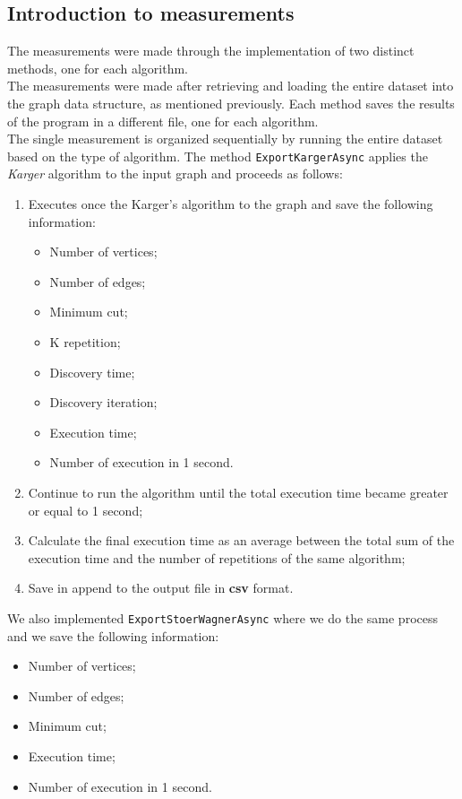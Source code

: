 \subsection{Introduction to measurements}
The measurements were made through the implementation of two distinct methods, one for each algorithm. \\ \noindent
The measurements were made after retrieving and loading the entire dataset into the graph data structure, as mentioned 
previously. Each method saves the results of the program in a different file, one for each algorithm.\\
\noindent
The single measurement is organized sequentially by running the entire dataset based on the type of algorithm. 
The method \verb|ExportKargerAsync| applies the \textit{Karger} algorithm to the input graph and proceeds as follows:
\begin{enumerate}
    \item Executes once the Karger's algorithm to the graph and save the following information:
        \begin{itemize}
            \item Number of vertices;
            \item Number of edges;
            \item Minimum cut;
            \item K repetition;
            \item Discovery time;
            \item Discovery iteration;
            \item Execution time;
            \item Number of execution in 1 second.
        \end{itemize}
    \item Continue to run the algorithm until the total execution time became greater or equal to 1 second;
    \item Calculate the final execution time as an average between the total sum of the execution time and the number of repetitions of the same algorithm;
    \item Save in append to the output file in \textbf{csv} format.
\end{enumerate}
We also implemented \verb|ExportStoerWagnerAsync| where we do the same process and we save the following information:
\begin{itemize}
    \item Number of vertices;
    \item Number of edges;
    \item Minimum cut;
    \item Execution time;
    \item Number of execution in 1 second.
\end{itemize}
